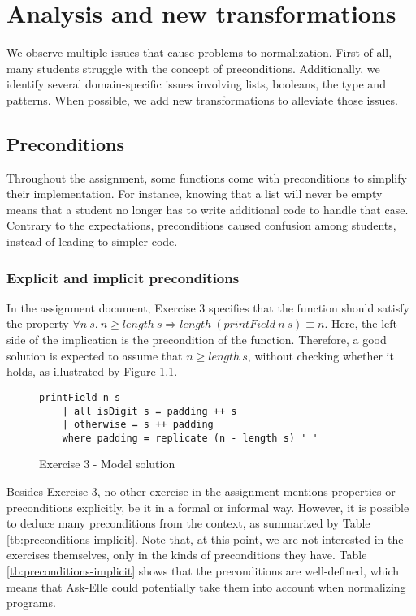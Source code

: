 \chapter{Analysis and new transformations}
\label{sec:analysis-results}

We observe multiple issues that cause problems to normalization. First of all, many students struggle with the concept of preconditions. Additionally, we identify several domain-specific issues involving lists, booleans, the  type and patterns. When possible, we add new transformations to alleviate those issues.

\section{Preconditions}
\label{sec:analysis-preconditions}

Throughout the assignment, some functions come with preconditions to simplify their implementation. For instance, knowing that a list will never be empty means that a student no longer has to write additional code to handle that case. Contrary to the expectations, preconditions caused confusion among students, instead of leading to simpler code.

\subsection{Explicit and implicit preconditions}

In the assignment document, Exercise 3 specifies that the function  should satisfy the property $\forall n\ s.\ n \geq length\ s \Rightarrow length\ (printField\ n\ s) \equiv n$. Here, the left side of the implication is the precondition of the function. Therefore, a good solution is expected to assume that $n \geq length\ s$, without checking whether it holds, as illustrated by Figure \ref{fig:ex3-model-solution}.

\begin{figure}[H]
\centering
\begin{verbatim}
printField n s
    | all isDigit s = padding ++ s
    | otherwise = s ++ padding
    where padding = replicate (n - length s) ' '
\end{verbatim}
\caption{Exercise 3 - Model solution}
\label{fig:ex3-model-solution}
\end{figure}

Besides Exercise 3, no other exercise in the assignment mentions properties or preconditions explicitly, be it in a formal or informal way. However, it is possible to deduce many preconditions from the context, as summarized by Table \ref{tb:preconditions-implicit}. Note that, at this point, we are not interested in the exercises themselves, only in the kinds of preconditions they have. Table \ref{tb:preconditions-implicit} shows that the preconditions are well-defined, which means that Ask-Elle could potentially take them into account when normalizing programs.

